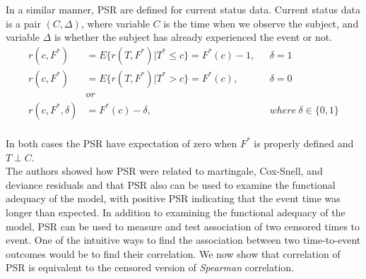\documentclass[]{article}
\begin{document}
In a similar manner, PSR are defined for current status data. Current status data is a pair $(C, \Delta)$, where variable $C$ is the time when we observe the subject, and variable $\Delta$ is whether the subject has already experienced the event or not.
	$$
	\begin{aligned}
		r(c, F^*) &= E\{r(T,F^*)|T^*\leq c\} = F^*(c) - 1,~~~&\delta = 1 \\
		r(c, F^*) &= E\{r(T,F^*)|T^*>c\} = F^*(c) ,~~~&\delta = 0 \\
		&or\\
    r(c, F^*, \delta) &= F^*(c) - \delta,~~~&where~\delta \in \{0,1\}\\
	\end{aligned}
	$$

In both cases the PSR have expectation of zero when $F^*$ is properly defined and $T \perp C$.\\

The authors showed how PSR were related to martingale, Cox-Snell, and deviance residuals and that PSR also can be used to examine the functional adequacy of the model, with positive PSR indicating that the event time was longer than expected. In addition to examining the functional adequacy of the model, PSR can be used to measure and test association of two censored times to event. One of the intuitive ways to find the association between two time-to-event outcomes would be to find their correlation. We now show that correlation of PSR is equivalent to the censored version of \emph{Spearman} correlation.
\end{document}
